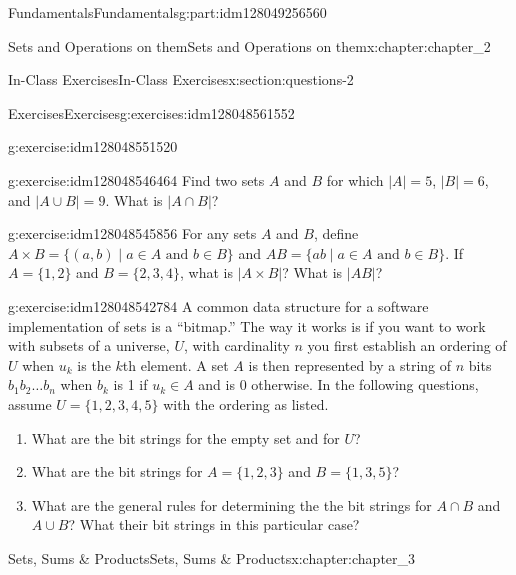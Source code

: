 \documentclass[oneside,10pt,]{book}
\numberwithin{equation}{section}
\begin{document}
\begin{partptx}{Fundamentals}{}{Fundamentals}{}{}{g:part:idm128049256560}
\begin{chapterptx}{Sets and Operations on them}{}{Sets and Operations on them}{}{}{x:chapter:chapter_2}
\begin{sectionptx}{In-Class Exercises}{}{In-Class Exercises}{}{}{x:section:questions-2}
\begin{exercises-subsection}{Exercises}{}{Exercises}{}{}{g:exercises:idm128048561552}
\begin{exercisegroup}
\begin{divisionexerciseeg}{3}{}{}{g:exercise:idm128048551520}
\begin{enumerate}[label=(\alph*)]
\end{enumerate}
%
\end{divisionexerciseeg}%
\begin{divisionexerciseeg}{4}{}{}{g:exercise:idm128048546464}%
Find two sets \(A\) and \(B\) for which \(|A| = 5\), \(|B| = 6\), and \(|A\cup B| = 9\). What is \(|A \cap B|\)?%
\end{divisionexerciseeg}%
\begin{divisionexerciseeg}{5}{}{}{g:exercise:idm128048545856}%
For any sets \(A\) and \(B\), define \(A\times B = \{(a,b) \mid a\in A \text{ and } b \in B\}\) and \(AB = \{ab \mid a\in A \text{ and } b \in B\}\). If \(A = \{1,2\}\) and \(B = \{2,3,4\}\),  what is \(|A \times B|\)? What is \(|AB|\)?%
\end{divisionexerciseeg}%
\begin{divisionexerciseeg}{6}{}{}{g:exercise:idm128048542784}%
A common data structure for a software implementation of sets is a ``bitmap.''  The way it works is if you want to work with subsets of a universe, \(U\), with cardinality \(n\) you first establish an ordering of \(U\) when \(u_k\) is the \(k\)th element.  A set \(A\) is then represented by a string of \(n\) bits  \(b_1b_2\dots b_n\) when \(b_k\) is 1 if \(u_k \in A\) and is 0 otherwise. In the following questions, assume \(U=\{1,2,3,4,5\}\) with the ordering as listed.%
\begin{enumerate}[label=(\alph*)]
\item{}What are the bit strings for the empty set and for \(U\)?%
\item{}What are the bit strings for \(A=\{1,2,3\}\) and \(B=\{1,3,5\}\)?%
\item{}What are the general rules for determining the the bit strings for \(A\cap B\) and \(A \cup B\)?  What their bit strings in this particular case?%
\end{enumerate}
%
\end{divisionexerciseeg}%
\end{exercisegroup}
\par\medskip\noindent
\end{exercises-subsection}
\end{sectionptx}
\end{chapterptx}
%
\typeout{************************************************}
\typeout{************************************************}
%
\begin{chapterptx}{Sets, Sums \& Products}{}{Sets, Sums \& Products}{}{}{x:chapter:chapter_3}

\end{chapterptx}
\end{partptx}
\end{document}
